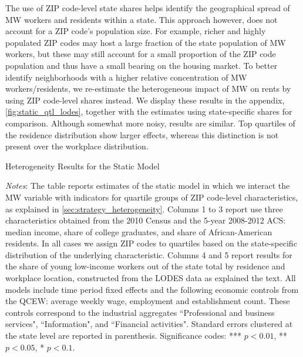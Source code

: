 The use of ZIP code-level state shares helps identify the geographical spread of MW 
workers and residents within a state. This approach however, does not account for 
a ZIP code's population size. For example, richer and highly populated ZIP codes may host a large 
fraction of the state population of MW workers, but these may still account for a small proportion 
of the ZIP code population and thus have a small bearing on the housing market. To better identify 
neighborhoods with a higher relative concentration of MW workers/residents, we re-estimate the 
heterogeneous impact of MW on rents by using ZIP code-level shares instead. We display these results 
in the appendix, \autoref{fig:static_qtl_lodes}, together with the estimates using state-specific 
shares for comparison. Although somewhat more noisy, results are similar. Top 
quartiles of the residence distribution show larger effects, whereas this distinction is not 
present over the workplace distribution.

\begin{table}[h!]
    \caption{Heterogeneity Results for the Static Model}
    \label{tab:fd_model_het}
    \centering
    \resizebox{\textwidth}{!}{
    }
    \begin{minipage}{0.95\textwidth} \footnotesize
		\vspace{3mm}
		\textit{Notes}: The table reports estimates of the static model in which we interact the 
		MW variable with indicators for quartile groups of ZIP code-level characteristics, as explained
		in \autoref{sec:strategy_heterogeneity}. Columns 1 to 3 report use three characteristics 
		obtained from the 2010 Census and the 5-year 2008-2012 ACS: median income, share of college
		graduates, and share of African-American residents. In all cases we assign ZIP codes to quartiles 
		based on the state-specific distribution of the underlying characteristic. Columns 4 and 5 
		report results for the share of young low-income workers out of the state total by residence
		and workplace location, constructed from the LODES data as explained the text. All models
		include time period fixed effects and the following economic controls from the QCEW: average
		weekly wage, employment and establishment count. These controls correspond to the industrial 
		aggregates ``Professional and business services", ``Information", and ``Financial activities".
		Standard errors clustered at the state level are reported in parenthesis. Significance codes: 
		*** $p < 0.01$, ** $p < 0.05$, * $p < 0.1$.
	\end{minipage}
\end{table}
